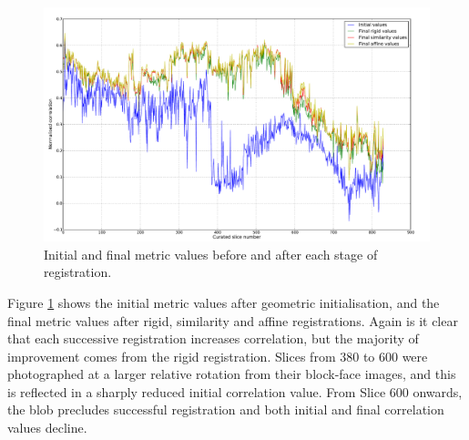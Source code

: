   \begin{figure}
    \centering
    \includegraphics[width=\textheight]{Ch5/Figs/diagnostics/initial_and_final_values_comparison}
    \caption{Initial and final metric values before and after each stage of registration.}
    \label{fig:initial_and_final_values_comparison}
  \end{figure}
  
	Figure \ref{fig:initial_and_final_values_comparison} shows the initial metric values after geometric initialisation, and the final metric values after rigid, similarity and affine registrations. Again is it clear that each successive registration increases correlation, but the majority of improvement comes from the rigid registration. Slices from 380 to 600 were photographed at a larger relative rotation from their block-face images, and this is reflected in a sharply reduced initial correlation value. From Slice 600 onwards, the blob precludes successful registration and both initial and final correlation values decline.
	
